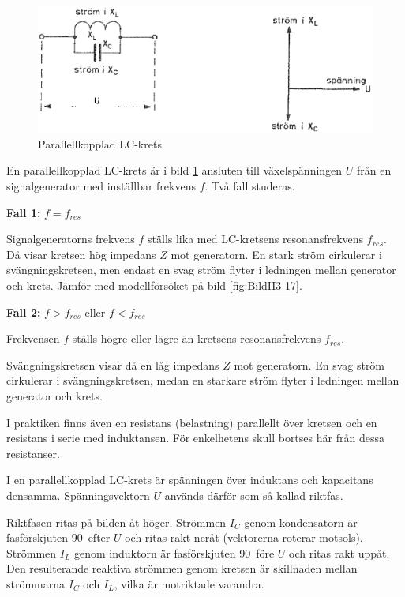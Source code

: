 \begin{figure}
\includegraphics[width=\textwidth]{images/cropped_pdfs/bild_2_3-15.pdf}
\caption{Parallellkopplad LC-krets}
\label{fig:BildII3-15}
\end{figure}

En parallellkopplad LC-krets är i bild \ref{fig:BildII3-15} ansluten till
växelspänningen \(U\) från en signalgenerator med inställbar frekvens \(f\).
Två fall studeras.

\textbf{Fall 1:} \(f = f_{res}\)

Signalgeneratorns frekvens \(f\) ställs lika med LC-kretsens resonansfrekvens
\(f_{res}\).
Då visar kretsen hög impedans \(Z\) mot generatorn.
En stark ström cirkulerar i svängningskretsen, men endast en svag ström flyter
i ledningen mellan generator och krets.
Jämför med modellförsöket på bild \ref{fig:BildII3-17}.

\textbf{Fall 2:} \(f > f_{res}\) eller \(f < f_{res}\)

Frekvensen \(f\) ställs högre eller lägre än kretsens resonansfrekvens
\(f_{res}\).

Svängningskretsen visar då en låg impedans \(Z\) mot generatorn.
En svag ström cirkulerar i svängningskretsen, medan en starkare ström flyter i
ledningen mellan generator och krets.

I praktiken finns även en resistans (belastning) parallellt över kretsen och en
resistans i serie med induktansen.
För enkelhetens skull bortses här från dessa resistanser.

I en parallellkopplad LC-krets är spänningen över induktans och kapacitans
densamma.
Spänningsvektorn \(U\) används därför som så kallad riktfas.

Riktfasen ritas på bilden åt höger.
Strömmen \(I_C\) genom kondensatorn är fasförskjuten 90\degree~efter \(U\) och
ritas rakt neråt (vektorerna roterar motsols).
Strömmen \(I_L\) genom induktorn är fasförskjuten 90\degree~före \(U\) och
ritas rakt uppåt.
Den resulterande reaktiva strömmen genom kretsen är skillnaden mellan
strömmarna \(I_C\) och \(I_L\), vilka är motriktade varandra.

